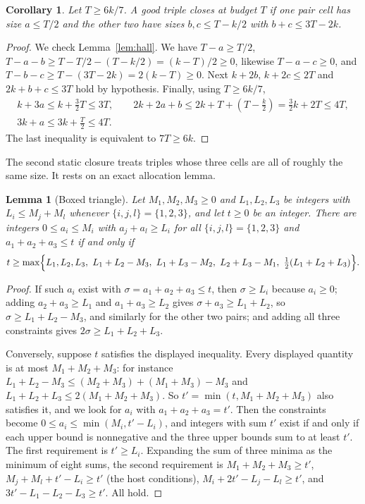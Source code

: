 \documentclass[11pt]{article}
\numberwithin{equation}{section}
\newtheorem{lemma}[theorem]{Lemma}
\newtheorem{corollary}[theorem]{Corollary}
\theoremstyle{definition}
\theoremstyle{remark}
\begin{document}
\begin{corollary}\label{cor:hall}
Let $T\ge6k/7$. A good triple closes at budget $T$ if one pair cell has
size $a\le T/2$ and the other two have sizes $b,c\le T-k/2$ with
$b+c\le3T-2k$.
\end{corollary}
\begin{proof}
We check Lemma~\ref{lem:hall}. We have $T-a\ge T/2$,
$T-a-b\ge T-T/2-(T-k/2)=(k-T)/2\ge0$, likewise $T-a-c\ge0$, and
$T-b-c\ge T-(3T-2k)=2(k-T)\ge0$. Next $k+2b,\,k+2c\le2T$ and $2k+b+c\le3T$
hold by hypothesis. Finally, using $T\ge6k/7$,
\begin{gather*}
 k+3a\le k+\tfrac32T\le3T,\qquad
 2k+2a+b\le2k+T+(T-\tfrac k2)=\tfrac32k+2T\le4T,\\
 3k+a\le3k+\tfrac T2\le4T .
\end{gather*}
The last inequality is equivalent to $7T\ge6k$.
\end{proof}

The second static closure treats triples whose three cells are all of
roughly the same size. It rests on an exact allocation lemma.

\begin{lemma}[Boxed triangle]\label{lem:triangle}
Let $M_1,M_2,M_3\ge0$ and $L_1,L_2,L_3$ be integers with
$L_i\le M_j+M_l$ whenever $\{i,j,l\}=\{1,2,3\}$, and let $t\ge0$ be an
integer. There are integers $0\le a_i\le M_i$ with $a_j+a_l\ge L_i$ for
all $\{i,j,l\}=\{1,2,3\}$ and $a_1+a_2+a_3\le t$ if and only if
\[
 t\ge\max\Bigl\{L_1,L_2,L_3,\ L_1+L_2-M_3,\ L_1+L_3-M_2,\ L_2+L_3-M_1,\
 \tfrac12(L_1+L_2+L_3)\Bigr\}.
\]
\end{lemma}
\begin{proof}
If such $a_i$ exist with $\sigma=a_1+a_2+a_3\le t$, then $\sigma\ge L_i$
because $a_i\ge0$; adding $a_2+a_3\ge L_1$ and $a_1+a_3\ge L_2$ gives
$\sigma+a_3\ge L_1+L_2$, so $\sigma\ge L_1+L_2-M_3$, and similarly for the
other two pairs; and adding all three constraints gives
$2\sigma\ge L_1+L_2+L_3$.

Conversely, suppose $t$ satisfies the displayed inequality. Every
displayed quantity is at most $M_1+M_2+M_3$: for instance
$L_1+L_2-M_3\le(M_2+M_3)+(M_1+M_3)-M_3$ and
$L_1+L_2+L_3\le2(M_1+M_2+M_3)$. So $t'=\min(t,M_1+M_2+M_3)$ also
satisfies it, and we look for $a_i$ with $a_1+a_2+a_3=t'$. Then the
constraints become $0\le a_i\le\min(M_i,t'-L_i)$, and integers with sum
$t'$ exist if and only if each upper bound is nonnegative and the three
upper bounds sum to at least $t'$. The first requirement is $t'\ge L_i$.
Expanding the sum of three minima as the minimum of eight sums, the
second requirement is $M_1+M_2+M_3\ge t'$, $M_j+M_l+t'-L_i\ge t'$ (the
host conditions), $M_i+2t'-L_j-L_l\ge t'$, and $3t'-L_1-L_2-L_3\ge t'$.
All hold.
\end{proof}
\end{document}
